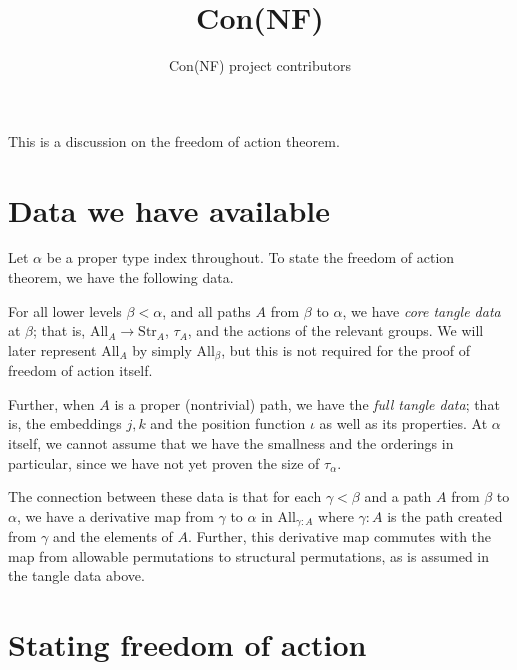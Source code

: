 \documentclass[a4paper]{article}
\title{Con(NF)}
\author{Con(NF) project contributors}
\begin{document}
\maketitle

\noindent This is a discussion on the freedom of action theorem.

\section{Data we have available}
Let \( \alpha \) be a proper type index throughout.
To state the freedom of action theorem, we have the following data.

For all lower levels \( \beta < \alpha \), and all paths \( A \) from \( \beta \) to \( \alpha \),
we have \textit{core tangle data} at \( \beta \); that is, \( \mathrm{All}_A \to \mathrm{Str}_A \), \( \tau_A \), and the actions of the relevant groups.
We will later represent \( \mathrm{All}_A \) by simply \( \mathrm{All}_\beta \), but this is not required for the proof of freedom of action itself.

Further, when \( A \) is a proper (nontrivial) path, we have the \textit{full tangle data}; that is, the embeddings \( j, k \) and the position function \( \iota \) as well as its properties.
At \( \alpha \) itself, we cannot assume that we have the smallness and the orderings in particular, since we have not yet proven the size of \( \tau_\alpha \).

The connection between these data is that for each \( \gamma < \beta \) and a path \( A \) from \( \beta \) to \( \alpha \), we have a derivative map from \( \gamma \) to \( \alpha \) in \( \mathrm{All}_{\gamma:A} \) where \( \gamma:A \) is the path created from \( \gamma \) and the elements of \( A \).
Further, this derivative map commutes with the map from allowable permutations to structural permutations, as is assumed in the tangle data above.

\section{Stating freedom of action}
\end{document}

